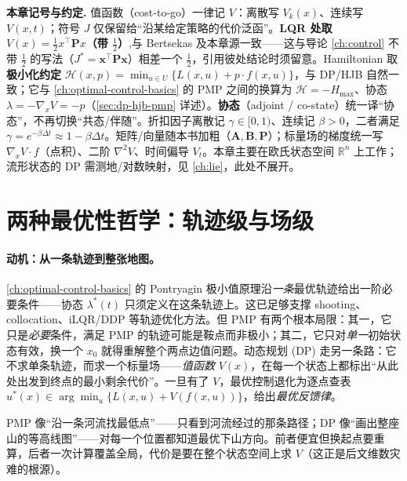 \begin{note}
\textbf{本章记号与约定.}\;
值函数（cost-to-go）一律记 $V$：离散写 $V_k(x)$、连续写 $V(x,t)$；符号 $J$ 仅保留给“沿某给定策略的代价泛函”。\textbf{LQR 处取 $V(x)=\tfrac12 x^\top\mathbf P x$（带 $\tfrac12$）},与 Bertsekas 及本章源一致——这与导论 \cref{ch:control} 不带 $\tfrac12$ 的写法（$J^*=\mathbf x^\top\mathbf P\mathbf x$）相差一个 $\tfrac12$，引用彼处结论时须留意。Hamiltonian 取\textbf{极小化约定}
$\mathcal H(x,p)=\min_{u\in U}\{L(x,u)+p\cdot f(x,u)\}$，与 DP/HJB 自然一致；它与 \cref{ch:optimal-control-basics} 的 PMP 之间的换算为 $\mathcal H=-H_{\max}$、协态 $\lambda=-\nabla_x V=-p$（\cref{sec:dp-hjb-pmp} 详述）。\textbf{协态}（adjoint / co-state）统一译“协态”，不再切换“共态/伴随”。折扣因子离散记 $\gamma\in[0,1)$、连续记 $\beta>0$，二者满足 $\gamma=e^{-\beta\Delta t}\approx1-\beta\Delta t$。矩阵/向量随本书加粗（$\mathbf A,\mathbf B,\mathbf P$）；标量场的梯度统一写 $\nabla_x V\cdot f$（点积）、二阶 $\nabla^2 V$、时间偏导 $V_t$。本章主要在欧氏状态空间 $\mathbb R^n$ 上工作；流形状态的 DP 需测地/对数映射，见 \cref{ch:lie}，此处不展开。
\end{note}

\section{两种最优性哲学：轨迹级与场级}
\label{sec:dp-intro}

\paragraph{动机：从一条轨迹到整张地图。}
\cref{ch:optimal-control-basics} 的 Pontryagin 极小值原理沿\emph{一条}最优轨迹给出一阶必要条件——协态 $\lambda^*(t)$ 只须定义在这条轨迹上。这已足够支撑 shooting、collocation、iLQR/DDP 等轨迹优化方法。但 PMP 有两个根本局限：其一，它只是\emph{必要}条件，满足 PMP 的轨迹可能是鞍点而非极小；其二，它只对\emph{单一}初始状态有效，换一个 $x_0$ 就得重解整个两点边值问题。动态规划 (DP) 走另一条路：它不求单条轨迹，而求一个标量场——\emph{值函数} $V(x)$，在每一个状态上都标出“从此处出发到终点的最小剩余代价”。一旦有了 $V$，最优控制退化为逐点查表 $u^*(x)\in\arg\min_u\{L(x,u)+V(f(x,u))\}$，给出\emph{最优反馈律}\cite{bertsekas2017dpoc1}。

\begin{remark}[一句话直觉]
PMP 像“沿一条河流找最低点”——只看到河流经过的那条路径；DP 像“画出整座山的等高线图”——对每一个位置都知道最优下山方向。前者便宜但换起点要重算，后者一次计算覆盖全局，代价是要在整个状态空间上求 $V$（这正是后文维数灾难的根源）。
\end{remark}

